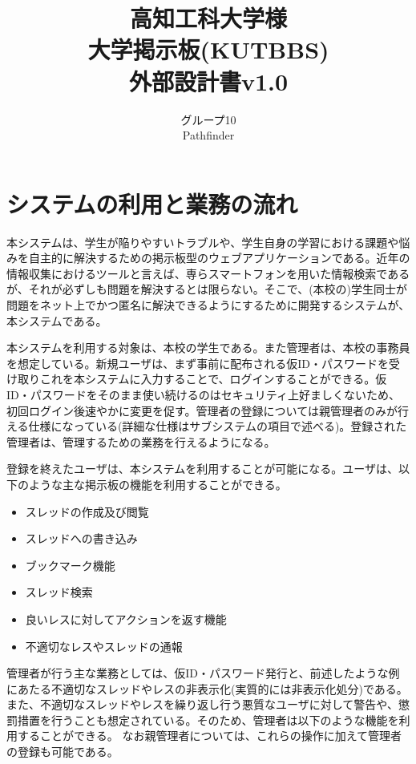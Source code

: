 \documentclass[a4j]{jarticle}
\title{
\vspace{30mm}
{\bf 高知工科大学様}
\\
\vspace{5mm}
大学掲示板(KUTBBS)\\
\vspace{5mm}
{\bf  外部設計書v1.0}
\vspace{90mm}
}
\author{
\vspace{5mm}
グループ10 \\
\vspace{5mm}
Pathfinder \\
\vspace{5mm}
\vspace{10mm}
}
\begin{document}
\maketitle
\tableofcontents
\newpage




\section{システムの利用と業務の流れ}
本システムは、学生が陥りやすいトラブルや、学生自身の学習における課題や悩みを自主的に解決するための掲示板型のウェブアプリケーションである。近年の情報収集におけるツールと言えば、専らスマートフォンを用いた情報検索であるが、それが必ずしも問題を解決するとは限らない。そこで、(本校の)学生同士が問題をネット上でかつ匿名に解決できるようにするために開発するシステムが、本システムである。



本システムを利用する対象は、本校の学生である。また管理者は、本校の事務員を想定している。新規ユーザは、まず事前に配布される仮ID・パスワードを受け取りこれを本システムに入力することで、ログインすることができる。仮ID・パスワードをそのまま使い続けるのはセキュリティ上好ましくないため、初回ログイン後速やかに変更を促す。管理者の登録については親管理者のみが行える仕様になっている(詳細な仕様はサブシステムの項目で述べる)。登録された管理者は、管理するための業務を行えるようになる。


登録を終えたユーザは、本システムを利用することが可能になる。ユーザは、以下のような主な掲示板の機能を利用することができる。
\begin{itemize}
  \item スレッドの作成及び閲覧
  \item スレッドへの書き込み
  \item ブックマーク機能
  \item スレッド検索
  \item 良いレスに対してアクションを返す機能
  \item 不適切なレスやスレッドの通報
\end{itemize}



管理者が行う主な業務としては、仮ID・パスワード発行と、前述したような例にあたる不適切なスレッドやレスの非表示化(実質的には非表示化処分)である。また、不適切なスレッドやレスを繰り返し行う悪質なユーザに対して警告や、懲罰措置を行うことも想定されている。そのため、管理者は以下のような機能を利用することができる。
なお親管理者については、これらの操作に加えて管理者の登録も可能である。
\end{document}
